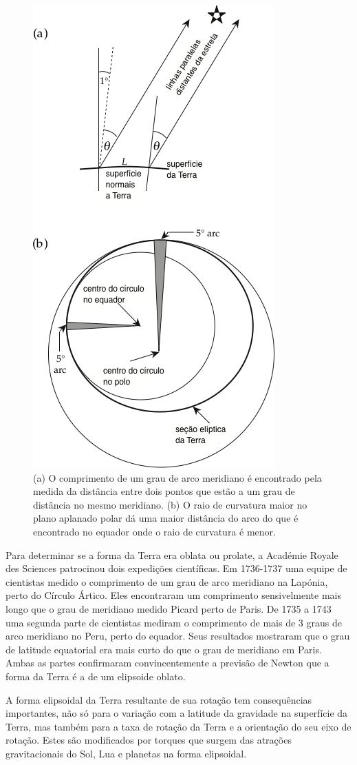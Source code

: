 \documentclass[]{book}
\theoremstyle{definition}
\theoremstyle{definition}
\theoremstyle{definition}
\theoremstyle{remark}
\begin{document}
\begin{figure}

{\centering \includegraphics[width=0.4\linewidth]{fig/Fig_02.03} 

}

\caption{(a) O comprimento de um grau de arco meridiano é encontrado pela medida da distância entre dois pontos que estão a um grau de distância no mesmo meridiano. (b) O raio de curvatura maior no plano aplanado polar dá uma maior distância do arco do que é encontrado no equador onde o raio de curvatura é menor.}\label{fig:elipse}
\end{figure}

Para determinar se a forma da Terra era oblata ou prolate, a Académie Royale des Sciences patrocinou dois expedições científicas. Em 1736-1737 uma equipe de cientistas medido o comprimento de um grau de arco meridiano na Lapónia, perto do Círculo Ártico. Eles encontraram um comprimento sensivelmente mais longo que o grau de meridiano medido Picard perto de Paris. De 1735 a 1743 uma segunda parte de cientistas mediram o comprimento de mais de 3 graus de arco meridiano no Peru, perto do equador. Seus resultados mostraram que o grau de latitude equatorial era mais curto do que o grau de meridiano em Paris. Ambas as partes confirmaram convincentemente a previsão de Newton que a forma da Terra é a de um elipsoide oblato.

A forma elipsoidal da Terra resultante de sua rotação tem consequências importantes, não só para o variação com a latitude da gravidade na superfície da Terra, mas também para a taxa de rotação da Terra e a orientação do seu eixo de rotação. Estes são modificados por torques que surgem das atrações gravitacionais do Sol, Lua e planetas na forma elipsoidal.
\end{document}
